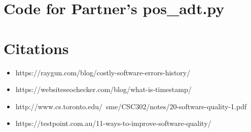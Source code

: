 \documentclass[12pt]{article}
\begin{document}
\section{Code for Partner's pos\_adt.py}

\noindent 

\newpage

\section{Citations}

\begin{itemize}

\item https://raygun.com/blog/costly-software-errors-history/

\item https://websiteseochecker.com/blog/what-is-timestamp/

\item http://www.cs.toronto.edu/~sme/CSC302/notes/20-software-quality-1.pdf

\item https://testpoint.com.au/11-ways-to-improve-software-quality/

\end{itemize}
\end{document}
